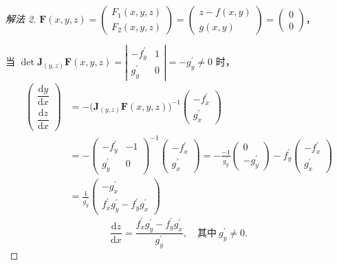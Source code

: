 \begin{proof}[解法 2]
$\boldsymbol{F}(x,y,z) = \begin{pmatrix} F_{1}(x,y,z) \\ F_{2}(x,y,z) \end{pmatrix} = \begin{pmatrix} z - f(x,y) \\ g(x,y) \end{pmatrix} = \begin{pmatrix} 0 \\ 0 \end{pmatrix}$，

当 $\det \boldsymbol{J}_{(y,z)}\boldsymbol{F}(x,y,z) = \left|\begin{matrix} -f_{y}^{\prime} & 1 \\ g_{y}^{\prime} & 0 \end{matrix}\right| = -g_{y}^{\prime} \neq 0$ 时，
\begin{align*}
  \begin{pmatrix} \dfrac{\mathrm{d}y}{\mathrm{d}x} \\ \dfrac{\mathrm{d}z}{\mathrm{d}x} \end{pmatrix} &= -\bigl(\boldsymbol{J}_{(y,z)}\boldsymbol{F}(x,y,z)\bigr)^{-1}\begin{pmatrix} -f_{x}^{\prime} \\ g_{x}^{\prime} \end{pmatrix} \\
  &= -\begin{pmatrix} -f_{y}^{\prime} & -1 \\ g_{y}^{\prime} & 0 \end{pmatrix}^{-1}\begin{pmatrix} -f_{x}^{\prime} \\ g_{x}^{\prime} \end{pmatrix} = -\frac{-1}{g_{y}^{\prime}}\begin{pmatrix} 0 \\ -g_{y}^{\prime} \end{pmatrix} - f_{y}^{\prime}\begin{pmatrix} -f_{x}^{\prime} \\ g_{x}^{\prime} \end{pmatrix} \\
  &= \frac{1}{g_{y}^{\prime}}\begin{pmatrix} -g_{x}^{\prime} \\ f_{x}^{\prime}g_{y}^{\prime} - f_{y}^{\prime}g_{x}^{\prime} \end{pmatrix}
\end{align*}
\[
  \frac{\mathrm{d}z}{\mathrm{d}x} = \frac{f_{x}^{\prime}g_{y}^{\prime} - f_{y}^{\prime}g_{x}^{\prime}}{g_{y}^{\prime}},\quad \text{其中}\ g_{y}^{\prime} \neq 0.
\]
\end{proof}

